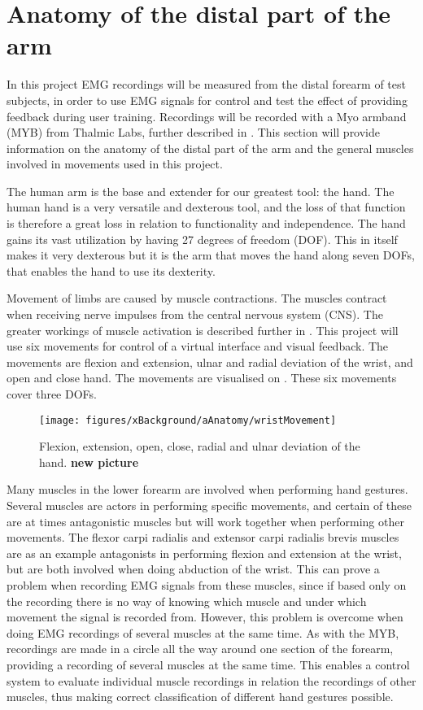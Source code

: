 \section{Anatomy of the distal part of the arm} \label{sec:anatomy}


In this project EMG recordings will be measured from the distal forearm of test subjects, in order to use EMG signals for control and test the effect of providing feedback during user training. Recordings will be recorded with a Myo armband (MYB) from Thalmic Labs, further described in . This section will provide information on the anatomy of the distal part of the arm and the general muscles involved in movements used in this project.

The human arm is the base and extender for our greatest tool: the hand. The human hand is a very versatile and dexterous tool, and the loss of that function is therefore a great loss in relation to functionality and independence. The hand gains its vast utilization by having 27 degrees of freedom (DOF). This in itself makes it very dexterous but it is the arm that moves the hand along seven DOFs, that enables the hand to use its dexterity.

Movement of limbs are caused by muscle contractions. The muscles contract when receiving nerve impulses from the central nervous system (CNS). The greater workings of muscle activation is described further in . This project will use six movements for control of a virtual interface and visual feedback. The movements are flexion and extension, ulnar and radial deviation of the wrist, and open and close hand. The movements are visualised on . These six movements cover three DOFs.

\begin{figure}[H] 
	\texttt{[image: figures/xBackground/aAnatomy/wristMovement]}
	\caption{Flexion, extension, open, close, radial and ulnar deviation of the hand. \textbf{new picture}}
	\label{fig:wristMovement}
\end{figure}

Many muscles in the lower forearm are involved when performing hand gestures. Several muscles are actors in performing specific movements, and certain of these are at times antagonistic muscles but will work together when performing other movements. The flexor carpi radialis and extensor carpi radialis brevis muscles are as an example antagonists in performing flexion and extension at the wrist, but are both involved when doing abduction of the wrist. This can prove a problem when recording EMG signals from these muscles, since if based only on the recording there is no way of knowing which muscle and under which movement the signal is recorded from. However, this problem is overcome when doing EMG recordings of several muscles at the same time. As with the MYB, recordings are made in a circle all the way around one section of the forearm, providing a recording of several muscles at the same time. This enables a control system to evaluate individual muscle recordings in relation the recordings of other muscles, thus making correct classification of different hand gestures possible. \cite{Mendez2017}


